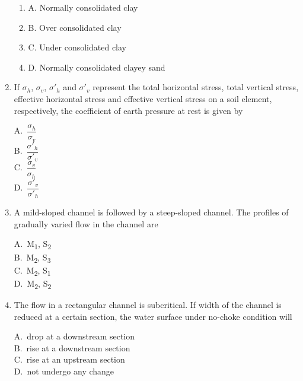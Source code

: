 \documentclass[journal,12pt,onecolumn]{exam}
\theoremstyle{remark}
\begin{document}
\begin{enumerate}
\begin{enumerate}[label=]
\item A. Normally consolidated clay \\
\item B. Over consolidated clay \\
\item C. Under consolidated clay \\
\item D. Normally consolidated clayey sand
\end{enumerate}

\setlength{\parindent}{0pt}
\setlength{\parskip}{0.5cm}

\raggedright


\noindent\item If $\sigma_h$, $\sigma_v$, $\sigma'_h$ and $\sigma'_v$ represent the total horizontal stress, total vertical stress, effective horizontal stress and effective vertical stress on a soil element, respectively, the coefficient of earth pressure at rest is given by
\hfill{}
\begin{multicols}{4}
A.\ $\dfrac{\sigma_h}{\sigma_v}$ \\
B.\ $\dfrac{\sigma'_h}{\sigma'_v}$ \\
C.\ $\dfrac{\sigma_v}{\sigma_h}$ \\
D.\ $\dfrac{\sigma'_v}{\sigma'_h}$
\end{multicols}

\noindent\item A mild-sloped channel is followed by a steep-sloped channel. The profiles of gradually varied flow in the channel are
\hfill{}
\begin{multicols}{4}
A.\ M\textsubscript{1}, S\textsubscript{2} \\
B.\ M\textsubscript{2}, S\textsubscript{3} \\
C.\ M\textsubscript{2}, S\textsubscript{1} \\
D.\ M\textsubscript{2}, S\textsubscript{2}
\end{multicols}

\noindent\item The flow in a rectangular channel is subcritical. If width of the channel is reduced at a certain section, the water surface under no-choke condition will
\hfill{}
\begin{multicols}{4}
A.\ drop at a downstream section \\
B.\ rise at a downstream section \\
C.\ rise at an upstream section \\
D.\ not undergo any change
\end{multicols}


\end{enumerate}
\end{document}
